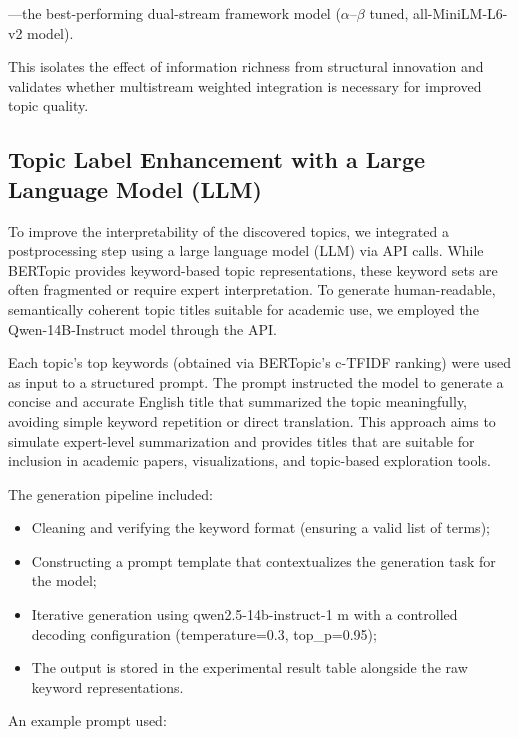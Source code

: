 \documentclass[authorproof,JACIII,researchpaper]{fujipressarticle}
\begin{document}
---the best-performing dual-stream framework model ($\alpha$--$\beta$ tuned, all-MiniLM-L6-v2 model).

This isolates the effect of information richness from structural innovation and validates whether multistream weighted integration is necessary for improved topic quality.

\subsection{Topic Label Enhancement with a Large Language Model (LLM)}

To improve the interpretability of the discovered topics, we integrated a postprocessing step using a large language model (LLM) via API calls. While BERTopic provides keyword-based topic representations, these keyword sets are often fragmented or require expert interpretation. To generate human-readable, semantically coherent topic titles suitable for academic use, we employed the Qwen-14B-Instruct model through the API.

Each topic's top keywords (obtained via BERTopic's c-TFIDF ranking) were used as input to a structured prompt. The prompt instructed the model to generate a concise and accurate English title that summarized the topic meaningfully, avoiding simple keyword repetition or direct translation. This approach aims to simulate expert-level summarization and provides titles that are suitable for inclusion in academic papers, visualizations, and topic-based exploration tools.

The generation pipeline included:

\begin{itemize}
    \item Cleaning and verifying the keyword format (ensuring a valid list of terms);
    \item Constructing a prompt template that contextualizes the generation task for the model;
    \item Iterative generation using qwen2.5-14b-instruct-1 m with a controlled decoding configuration (temperature=0.3, top\_p=0.95);
    \item The output is stored in the experimental result table alongside the raw keyword representations.
\end{itemize}

An example prompt used:
\end{document}
